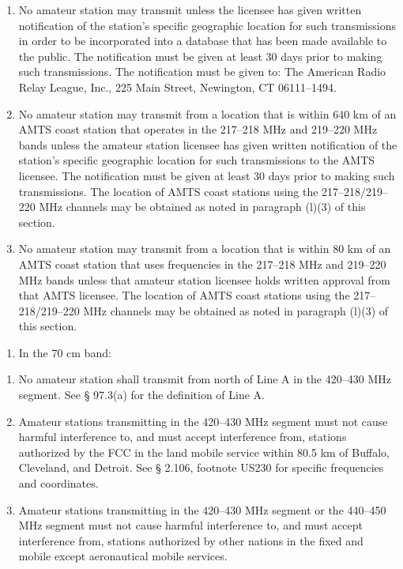 \documentclass[
  letterpaper,
  DIV=11,
  numbers=noendperiod]{scrreport}
\providecommand{\tightlist}{%
  \setlength{\itemsep}{0pt}\setlength{\parskip}{0pt}}\usepackage{longtable,booktabs,array}
\begin{document}
\begin{enumerate}
\def\labelenumi{(\arabic{enumi})}
\setcounter{enumi}{2}
\item
  No amateur station may transmit unless the licensee has given written
  notification of the station's specific geographic location for such
  transmissions in order to be incorporated into a database that has
  been made available to the public. The notification must be given at
  least 30 days prior to making such transmissions. The notification
  must be given to: The American Radio Relay League, Inc., 225 Main
  Street, Newington, CT 06111--1494.
\item
  No amateur station may transmit from a location that is within 640 km
  of an AMTS coast station that operates in the 217--218 MHz and
  219--220 MHz bands unless the amateur station licensee has given
  written notification of the station's specific geographic location for
  such transmissions to the AMTS licensee. The notification must be
  given at least 30 days prior to making such transmissions. The
  location of AMTS coast stations using the 217--218/219--220 MHz
  channels may be obtained as noted in paragraph (l)(3) of this section.
\item
  No amateur station may transmit from a location that is within 80 km
  of an AMTS coast station that uses frequencies in the 217--218 MHz and
  219--220 MHz bands unless that amateur station licensee holds written
  approval from that AMTS licensee. The location of AMTS coast stations
  using the 217--218/219--220 MHz channels may be obtained as noted in
  paragraph (l)(3) of this section.
\end{enumerate}

\begin{enumerate}
\def\labelenumi{(\alph{enumi})}
\setcounter{enumi}{12}
\tightlist
\item
  In the 70 cm band:
\end{enumerate}

\begin{enumerate}
\def\labelenumi{(\arabic{enumi})}
\item
  No amateur station shall transmit from north of Line A in the 420--430
  MHz segment. See § 97.3(a) for the definition of Line A.
\item
  Amateur stations transmitting in the 420--430 MHz segment must not
  cause harmful interference to, and must accept interference from,
  stations authorized by the FCC in the land mobile service within 80.5
  km of Buffalo, Cleveland, and Detroit. See § 2.106, footnote US230 for
  specific frequencies and coordinates.
\item
  Amateur stations transmitting in the 420--430 MHz segment or the
  440--450 MHz segment must not cause harmful interference to, and must
  accept interference from, stations authorized by other nations in the
  fixed and mobile except aeronautical mobile services.
\end{enumerate}
\end{document}
